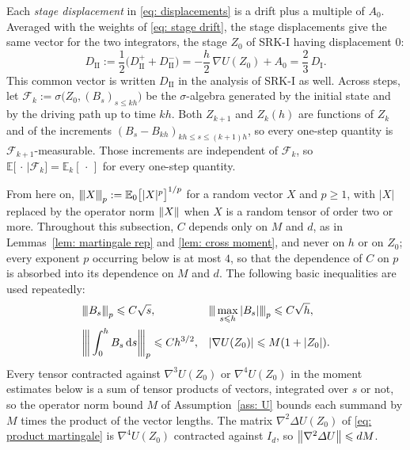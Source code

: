 \documentclass[namedate,webpdf,imanum]{ima-authoring-template}
\newcommand{\pnorm}[1]{{\vert\kern-0.25ex\vert\kern-0.25ex\vert} #1 {\vert\kern-0.25ex\vert\kern-0.25ex\vert}}
\newcommand{\triline}[1][]{#1\vert\kern-0.25ex#1\vert\kern-0.25ex#1\vert}
\newcommand{\Le}{\leqslant}
\newcommand{\Ge}{\geqslant}
\newcommand{\D}{\mathrm{d}}
\theoremstyle{thmstyletwo}
\numberwithin{equation}{section}
\begin{document}
Each \emph{stage displacement} in \eqref{eq: displacements} is a drift plus a multiple of $A_0$. Averaged with the weights of \eqref{eq: stage drift}, the stage displacements give the same vector for the two integrators, the stage $Z_0$ of SRK-I having displacement $0$:
\begin{equation}
    D_{\mathrm{II}} := \frac12 \bigl( D_{\mathrm{II}}^{+} + D_{\mathrm{II}}^{-} \bigr)
    = - \frac h2\, \nabla U(Z_0) + A_0
    = \frac23\, D_{\mathrm I} .
    \label{eq: mean stage}
\end{equation}
This common vector is written $D_{\mathrm{II}}$ in the analysis of SRK-I as well. Across steps, let $\mathcal F_k := \sigma\bigl( Z_0, (B_s)_{s \Le kh} \bigr)$ be the $\sigma$-algebra generated by the initial state and by the driving path up to time $kh$. Both $Z_{k+1}$ and $Z_k(h)$ are functions of $Z_k$ and of the increments $(B_s - B_{kh})_{kh \Le s \Le (k+1)h}$, so every one-step quantity is $\mathcal F_{k+1}$-measurable. Those increments are independent of $\mathcal F_k$, so $\mathbb E\bigl[\,\cdot\, \big| \mathcal F_k \bigr] = \mathbb E_k[\,\cdot\,]$ for every one-step quantity.

From here on, $\pnorm{X}_p := \mathbb E_0\bigl[ |X|^p \bigr]^{1/p}$ for a random vector $X$ and $p \Ge 1$, with $|X|$ replaced by the operator norm $\norm{X}$ when $X$ is a random tensor of order two or more. Throughout this subsection, $C$ depends only on $M$ and $d$, as in Lemmas~\ref{lem: martingale rep} and \ref{lem: cross moment}, and never on $h$ or on $Z_0$; every exponent $p$ occurring below is at most $4$, so that the dependence of $C$ on $p$ is absorbed into its dependence on $M$ and $d$. The following basic inequalities are used repeatedly:
\begin{equation*}
\begin{aligned}
    & \pnorm{B_s}_p \Le C \sqrt s , &
    & \pnorm{\max_{s \Le h} |B_s|}_p \Le C \sqrt h , \\
    & \triline[\bigg] \int_0^h B_s\,\D s \triline[\bigg]_p \Le C h^{3/2} , &
    & |\nabla U(Z_0)| \Le M (1 + |Z_0|) .
\end{aligned}
\end{equation*}
Every tensor contracted against $\nabla^3 U(Z_0)$ or $\nabla^4 U(Z_0)$ in the moment estimates below is a sum of tensor products of vectors, integrated over $s$ or not, so the operator norm bound $M$ of Assumption~\ref{ass: U} bounds each summand by $M$ times the product of the vector lengths. The matrix $\nabla^2 \Delta U(Z_0)$ of \eqref{eq: product martingale} is $\nabla^4 U(Z_0)$ contracted against $I_d$, so $\norm{\nabla^2 \Delta U} \Le d M$.
\end{document}
